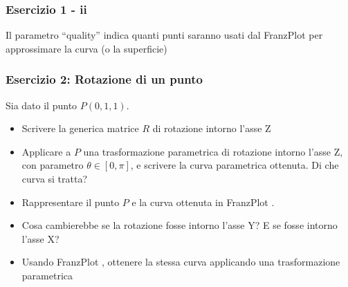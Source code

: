 \documentclass{beamer}
\newcommand{\fig}{figures} %
\newcommand{\frnzplt}{FranzPlot }
\begin{document}
\begin{frame}
\frametitle{Esercizio 1 - ii}
\begin{center}
\end{center}
    Il parametro ``quality'' indica quanti punti saranno usati dal \frnzplt per
    approssimare la curva (o la superficie)

\end{frame}
\begin{frame}
\frametitle{Esercizio 2: Rotazione di un punto}

    Sia dato il punto $P(0, 1, 1)$.
    \begin{itemize}
        \item Scrivere la generica matrice $R$ di rotazione intorno l'asse Z
        \item Applicare a $P$ una trasformazione parametrica di rotazione intorno l'asse Z, con parametro $\theta \in [0, \pi]$,
            e scrivere la curva parametrica ottenuta. Di che curva si tratta?
        \item Rappresentare il punto $P$ e la curva ottenuta in \frnzplt.
        \item Cosa cambierebbe se la rotazione fosse intorno l'asse Y? E se fosse intorno l'asse X?
        \item Usando \frnzplt, ottenere la stessa curva applicando una trasformazione parametrica
    \end{itemize}

\end{frame}
\end{document}
